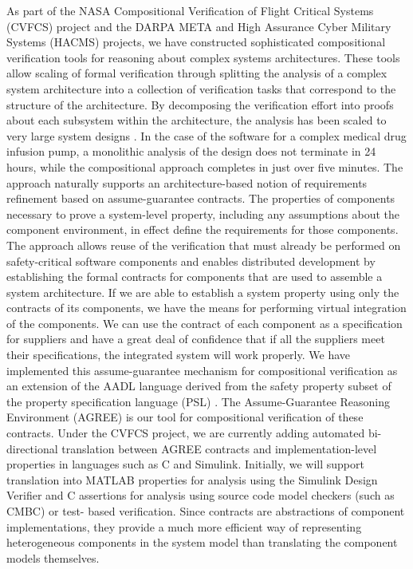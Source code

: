As part of the NASA Compositional Verification of Flight Critical Systems (CVFCS) project and the DARPA META and High Assurance Cyber Military Systems (HACMS) projects, we have constructed sophisticated compositional verification tools for reasoning about complex systems architectures. These tools \cite{NFM2012:CoGaMiWhLaLu} allow scaling of formal verification through splitting the analysis of a complex system architecture into a collection of verification tasks that correspond to the structure of the architecture. By decomposing the verification effort into proofs about each subsystem within the architecture, the analysis has been scaled to very large system designs \cite{QFCS15:backes}. In the case of the software for a complex medical drug infusion pump, a monolithic analysis of the design does not terminate in 24 hours, while the compositional approach completes in just over five minutes.
The approach naturally supports an architecture-based notion of requirements refinement based on assume-guarantee contracts. The properties of components necessary to prove a system-level property, including any assumptions about the component environment, in effect define the requirements for those components. The approach allows reuse of the verification that must already be performed on safety-critical software components and enables distributed development by establishing the formal contracts for components that are used to assemble a system architecture. If we are able to establish a system property using only the contracts of its components, we have the means for performing virtual integration of the components. We can use the contract of each component as a specification for suppliers and have a great deal of confidence that if all the suppliers meet their specifications, the integrated system will work properly.
We have implemented this assume-guarantee mechanism for compositional verification as an extension of the AADL language derived from the safety property subset of the property specification language (PSL) \cite{IEEE:PSL}. The Assume-Guarantee Reasoning Environment (AGREE) is our tool for compositional verification of these contracts. Under the CVFCS project, we are currently adding automated bi-directional translation between AGREE contracts and implementation-level properties in languages such as C and Simulink. Initially, we will support translation into MATLAB properties for analysis using the Simulink Design Verifier and C assertions for analysis using source code model checkers (such as CMBC) or test- based verification. Since contracts are abstractions of component implementations, they provide a much more efficient way of representing heterogeneous components in the system model than translating the component models themselves.

\fi

